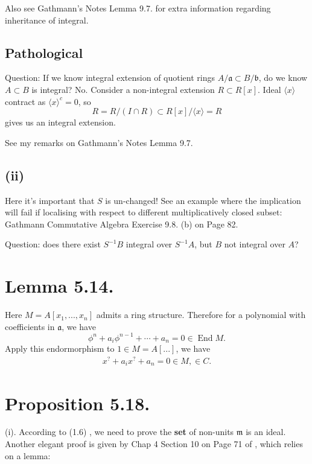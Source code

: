 Also see Gathmann's Notes Lemma 9.7. for extra information regarding inheritance of integral.

\subsection{Pathological}

Question: If we know integral extension of quotient rings $A/\mathfrak a\subset B/\mathfrak b$, do we know $A\subset B$ is integral? No. Consider a non-integral extension $R\subset R[x]$. Ideal $\langle x\rangle$ contract as $\langle x\rangle^c=0$, so 
\[R=R/(I\cap R)\subset R[x]/\langle x\rangle=R\] gives us an integral extension.

See my remarks on Gathmann's Notes Lemma 9.7.

\subsection{(ii)}

Here it's important that $S$ is un-changed! See an example where the implication will fail if localising with respect to different multiplicatively closed subset: Gathmann Commutative Algebra Exercise 9.8. (b) on Page 82.

Question: does there exist $S^{-1}B$ integral over $S^{-1}A$, but $B$ not integral over $A$?

\section{Lemma 5.14.}

Here $M=A[x_1,...,x_n]$ admits a ring structure. Therefore for a polynomial with coefficients in $\mathfrak a$, we have 
\[\phi^n+a_i\phi^{n-1}+\cdots+a_n=0\in\operatorname{End}M.\]Apply this endormorphism to $1\in M=A[...]$, we have 
\begin{align*}
	x^?+a_i x^?+a_n=0\in M, \in C.
\end{align*}

\section{Proposition 5.18.}

(i). According to (1.6) \cite{atiyah1994introduction}, we need to prove the \textbf{set} of non-units $\mathfrak m$  is an ideal. Another elegant proof is given by Chap 4 Section 10 on Page 71 of \cite{matsumura1989commutative}, which relies on a lemma: 

